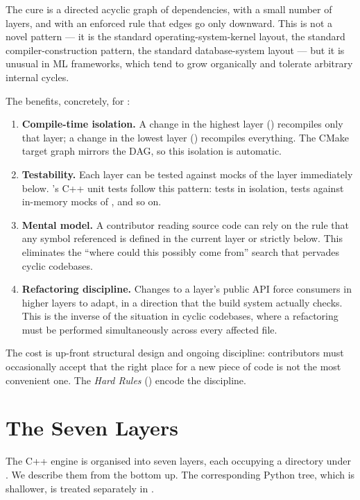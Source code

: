The cure is a directed acyclic graph of dependencies, with a small
number of layers, and with an enforced rule that edges go only
downward. This is not a novel pattern --- it is the standard
operating-system-kernel layout, the standard compiler-construction
pattern, the standard database-system layout --- but it is unusual
in ML frameworks, which tend to grow organically and tolerate
arbitrary internal cycles.

The benefits, concretely, for \Lucid:

\begin{enumerate}
  \item \textbf{Compile-time isolation.} A change in the highest
    layer () recompiles only that layer; a change in
    the lowest layer () recompiles everything. The CMake
    target graph mirrors the DAG, so this isolation is automatic.
  \item \textbf{Testability.} Each layer can be tested against
    mocks of the layer immediately below. \Lucid's C++ unit tests
    follow this pattern:  tests  in
    isolation,  tests  against
    in-memory mocks of , and so on.
  \item \textbf{Mental model.} A contributor reading source code
    can rely on the rule that any symbol referenced is defined in
    the current layer or strictly below. This eliminates the
    ``where could this possibly come from'' search that pervades
    cyclic codebases.
  \item \textbf{Refactoring discipline.} Changes to a layer's
    public API force consumers in higher layers to adapt, in a
    direction that the build system actually checks. This is the
    inverse of the situation in cyclic codebases, where a
    refactoring must be performed simultaneously across every
    affected file.
\end{enumerate}

The cost is up-front structural design and ongoing discipline:
contributors must occasionally accept that the right place for a
new piece of code is not the most convenient one. The \emph{Hard
Rules} () encode the discipline.

\section{The Seven Layers}
\label{sec:layered_dag:layers}

The C++ engine is organised into seven layers, each occupying a
directory under . We describe them from the bottom
up. The corresponding Python tree, which is shallower, is treated
separately in .

